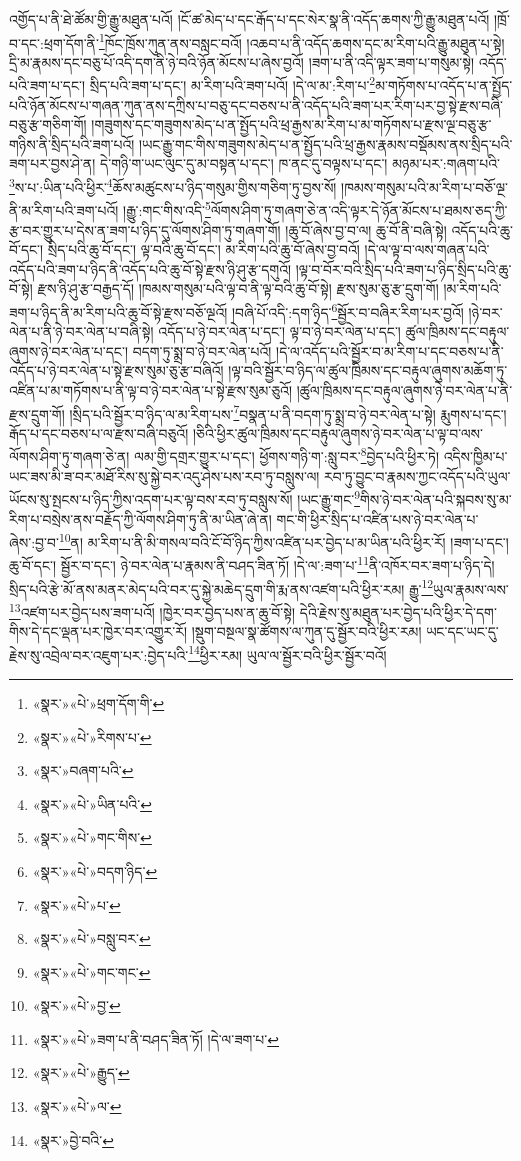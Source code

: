 འགྱོད་པ་ནི་ཐེ་ཚོམ་གྱི་རྒྱུ་མཐུན་པའོ། །ངོ་ཚ་མེད་པ་དང་རྒོད་པ་དང་སེར་སྣ་ནི་འདོད་ཆགས་ཀྱི་རྒྱུ་མཐུན་པའོ། །ཁྲོ་བ་དང་:ཕྲག་དོག་ནི་\footnote{«སྣར་»«པེ་»ཕྲག་དོག་གི་}ཁོང་ཁྲོས་ཀུན་ནས་བསླང་བའོ། །འཆབ་པ་ནི་འདོད་ཆགས་དང་མ་རིག་པའི་རྒྱུ་མཐུན་པ་སྟེ། དྲི་མ་རྣམས་དང་བཅུ་པོ་འདི་དག་ནི་ཉེ་བའི་ཉོན་མོངས་པ་ཞེས་བྱའོ། །ཟག་པ་ནི་འདི་ལྟར་ཟག་པ་གསུམ་སྟེ། འདོད་པའི་ཟག་པ་དང་། སྲིད་པའི་ཟག་པ་དང་། མ་རིག་པའི་ཟག་པའོ། །དེ་ལ་མ་:རིག་པ་\footnote{«སྣར་»«པེ་»རིགས་པ་}མ་གཏོགས་པ་འདོད་པ་ན་སྤྱོད་པའི་ཉོན་མོངས་པ་གཞན་ཀུན་ནས་དཀྲིས་པ་བཅུ་དང་བཅས་པ་ནི་འདོད་པའི་ཟག་པར་རིག་པར་བྱ་སྟེ་རྫས་བཞི་བཅུ་རྩ་གཅིག་གོ། །གཟུགས་དང་གཟུགས་མེད་པ་ན་སྤྱོད་པའི་ཕྲ་རྒྱས་མ་རིག་པ་མ་གཏོགས་པ་རྫས་ལྔ་བཅུ་རྩ་གཉིས་ནི་སྲིད་པའི་ཟག་པའོ། །ཡང་རྒྱུ་གང་གིས་གཟུགས་མེད་པ་ན་སྤྱོད་པའི་ཕྲ་རྒྱས་རྣམས་བསྡོམས་ནས་སྲིད་པའི་ཟག་པར་བྱས་ཤེ་ན། དེ་གཉི་ག་ཡང་ལུང་དུ་མ་བསྟན་པ་དང་། ཁ་ནང་དུ་བལྟས་པ་དང་། མཉམ་པར་:གཞག་པའི་\footnote{«སྣར་»བཞག་པའི་}ས་པ་:ཡིན་པའི་ཕྱིར་\footnote{«སྣར་»«པེ་»ཡིན་པའི་}ཆོས་མཚུངས་པ་ཉིད་གསུམ་གྱིས་གཅིག་ཏུ་བྱས་སོ། །ཁམས་གསུམ་པའི་མ་རིག་པ་བཅོ་ལྔ་ནི་མ་རིག་པའི་ཟག་པའོ། །རྒྱུ་:གང་གིས་འདི་\footnote{«སྣར་»«པེ་»གང་གིས་}ལོགས་ཤིག་ཏུ་གཞག་ཅེ་ན་འདི་ལྟར་དེ་ཉོན་མོངས་པ་ཐམས་ཅད་ཀྱི་རྩ་བར་གྱུར་པ་དེས་ན་ཟག་པ་ཉིད་དུ་ལོགས་ཤིག་ཏུ་གཞག་གོ། །ཆུ་བོ་ཞེས་བྱ་བ་ལ། ཆུ་བོ་ནི་བཞི་སྟེ། འདོད་པའི་ཆུ་བོ་དང་། སྲིད་པའི་ཆུ་བོ་དང་། ལྟ་བའི་ཆུ་བོ་དང་། མ་རིག་པའི་ཆུ་བོ་ཞེས་བྱ་བའོ། །དེ་ལ་ལྟ་བ་ལས་གཞན་པའི་འདོད་པའི་ཟག་པ་ཉིད་ནི་འདོད་པའི་ཆུ་བོ་སྟེ་རྫས་ཉི་ཤུ་རྩ་དགུའོ། །ལྟ་བ་བོར་བའི་སྲིད་པའི་ཟག་པ་ཉིད་སྲིད་པའི་ཆུ་བོ་སྟེ། རྫས་ཉི་ཤུ་རྩ་བརྒྱད་དོ། །ཁམས་གསུམ་པའི་ལྟ་བ་ནི་ལྟ་བའི་ཆུ་བོ་སྟེ། རྫས་སུམ་ཅུ་རྩ་དྲུག་གོ། །མ་རིག་པའི་ཟག་པ་ཉིད་ནི་མ་རིག་པའི་ཆུ་བོ་སྟེ་རྫས་བཅོ་ལྔའོ། །བཞི་པོ་འདི་:དག་ཉིད་\footnote{«སྣར་»«པེ་»བདག་ཉིད་}སྦྱོར་བ་བཞིར་རིག་པར་བྱའོ། །ཉེ་བར་ལེན་པ་ནི་ཉེ་བར་ལེན་པ་བཞི་སྟེ། འདོད་པ་ཉེ་བར་ལེན་པ་དང་། ལྟ་བ་ཉེ་བར་ལེན་པ་དང་། ཚུལ་ཁྲིམས་དང་བརྟུལ་ཞུགས་ཉེ་བར་ལེན་པ་དང་། བདག་ཏུ་སྨྲ་བ་ཉེ་བར་ལེན་པའོ། །དེ་ལ་འདོད་པའི་སྦྱོར་བ་མ་རིག་པ་དང་བཅས་པ་ནི་འདོད་པ་ཉེ་བར་ལེན་པ་སྟེ་རྫས་སུམ་ཅུ་རྩ་བཞིའོ། །ལྟ་བའི་སྦྱོར་བ་ཉིད་ལ་ཚུལ་ཁྲིམས་དང་བརྟུལ་ཞུགས་མཆོག་ཏུ་འཛིན་པ་མ་གཏོགས་པ་ནི་ལྟ་བ་ཉེ་བར་ལེན་པ་སྟེ་རྫས་སུམ་ཅུའོ། །ཚུལ་ཁྲིམས་དང་བརྟུལ་ཞུགས་ཉེ་བར་ལེན་པ་ནི་རྫས་དྲུག་གོ། །སྲིད་པའི་སྦྱོར་བ་ཉིད་ལ་མ་རིག་པས་\footnote{«སྣར་»«པེ་»པ་}བསྣན་པ་ནི་བདག་ཏུ་སྨྲ་བ་ཉེ་བར་ལེན་པ་སྟེ། རྨུགས་པ་དང་། རྒོད་པ་དང་བཅས་པ་ལ་རྫས་བཞི་བཅུའོ། །ཅིའི་ཕྱིར་ཚུལ་ཁྲིམས་དང་བརྟུལ་ཞུགས་ཉེ་བར་ལེན་པ་ལྟ་བ་ལས་ལོགས་ཤིག་ཏུ་གཞག་ཅེ་ན། ལམ་གྱི་དགྲར་གྱུར་པ་དང་། ཕྱོགས་གཉི་ག་:སླུ་བར་\footnote{«སྣར་»«པེ་»བསླུ་བར་}བྱེད་པའི་ཕྱིར་ཏེ། འདིས་ཁྱིམ་པ་ཡང་ཟས་མི་ཟ་བར་མཐོ་རིས་སུ་སྐྱེ་བར་འདུ་ཤེས་པས་རབ་ཏུ་བསླུས་ལ། རབ་ཏུ་བྱུང་བ་རྣམས་ཀྱང་འདོད་པའི་ཡུལ་ཡོངས་སུ་སྤངས་པ་ཉིད་ཀྱིས་འདག་པར་ལྟ་བས་རབ་ཏུ་བསླུས་སོ། །ཡང་རྒྱུ་གང་\footnote{«སྣར་»«པེ་»གང་གང་}གིས་ཉེ་བར་ལེན་པའི་སྐབས་སུ་མ་རིག་པ་བསྲེས་ནས་བརྗོད་ཀྱི་ལོགས་ཤིག་ཏུ་ནི་མ་ཡིན་ཞེ་ན། གང་གི་ཕྱིར་སྲིད་པ་འཛིན་པས་ཉེ་བར་ལེན་པ་ཞེས་:བྱ་བ་\footnote{«སྣར་»«པེ་»བྱ་}ན། མ་རིག་པ་ནི་མི་གསལ་བའི་ངོ་བོ་ཉིད་ཀྱིས་འཛིན་པར་བྱེད་པ་མ་ཡིན་པའི་ཕྱིར་རོ། །ཟག་པ་དང་། ཆུ་བོ་དང་། སྦྱོར་བ་དང་། ཉེ་བར་ལེན་པ་རྣམས་ནི་བཤད་ཟིན་ཏོ། །དེ་ལ་:ཟག་པ་\footnote{«སྣར་»«པེ་»ཟག་པ་ནི་བཤད་ཟིན་ཏོ། །དེ་ལ་ཟག་པ་}ནི་འཁོར་བར་ཟག་པ་ཉིད་དེ། སྲིད་པའི་རྩེ་མོ་ནས་མནར་མེད་པའི་བར་དུ་སྐྱེ་མཆེད་དྲུག་གི་རྨ་ནས་འཛག་པའི་ཕྱིར་རམ། རྒྱུ་\footnote{«སྣར་»«པེ་»རྒྱུད་}ཡུལ་རྣམས་ལས་\footnote{«སྣར་»«པེ་»ལ་}འཛག་པར་བྱེད་པས་ཟག་པའོ། །ཁྱེར་བར་བྱེད་པས་ན་ཆུ་བོ་སྟེ། དེའི་རྗེས་སུ་མཐུན་པར་བྱེད་པའི་ཕྱིར་དེ་དག་གིས་དེ་དང་ལྡན་པར་ཁྱེར་བར་འགྱུར་རོ། །སྡུག་བསྔལ་སྣ་ཚོགས་ལ་ཀུན་དུ་སྦྱོར་བའི་ཕྱིར་རམ། ཡང་དང་ཡང་དུ་རྗེས་སུ་འབྲེལ་བར་འཇུག་པར་:བྱེད་པའི་\footnote{«སྣར་»བྱེ་བའི་}ཕྱིར་རམ། ཡུལ་ལ་སྦྱོར་བའི་ཕྱིར་སྦྱོར་བའོ། 
